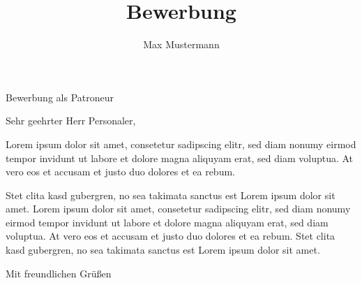 \documentclass[german]{alpication}
\author{Max Mustermann}
\title{Bewerbung}
\begin{document}
% 
% 
\begin{correspondence}{Bewerbung als Patroneur} %
	\opening{Sehr geehrter Herr Personaler,} %

	Lorem ipsum dolor sit amet, consetetur sadipscing elitr, sed diam nonumy eirmod tempor invidunt ut labore
	et dolore magna aliquyam erat, sed diam voluptua. At vero eos et accusam et justo duo dolores et ea rebum.
	
	Stet clita kasd gubergren, no sea takimata sanctus est Lorem ipsum dolor sit amet. Lorem ipsum dolor sit amet,
	consetetur sadipscing elitr, sed diam nonumy eirmod tempor invidunt ut labore et dolore magna aliquyam erat,
	sed diam voluptua. At vero eos et accusam et justo duo dolores et ea rebum. Stet clita kasd gubergren, no sea
	takimata sanctus est Lorem ipsum dolor sit amet.

	\closing{Mit freundlichen Grüßen}
	
	\appendixList %
	
\end{correspondence}

% 
%
\end{document}
